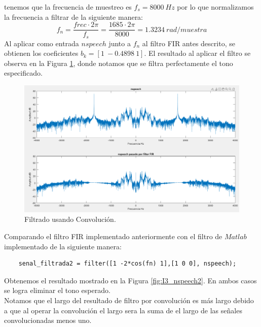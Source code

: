 \documentclass[letterpaper,onecolumn,10pt,journal,final]{IEEEtran}
\begin{document}
\begin{enumerate}[1)]
    tenemos que la frecuencia de muestreo es $f_s = 8000~Hz$ por lo que normalizamos la frecuencia a filtrar de la siguiente manera:
    \begin{equation*}
        f_n = \frac{frec \cdot 2 \pi}{f_s} = \frac{1685 \cdot 2 \pi }{ 8000 } = 1.3234 ~ rad/muestra
    \end{equation*}
    Al aplicar como entrada $nspeech$ junto a $f_n$ al filtro FIR antes descrito, se obtienen los coeficientes $b_k = [1~-0.4898~1]$. El resultado al aplicar el filtro se observa en la Figura \ref{fig:I3_nspeech}, donde notamos que se filtra perfectamente el tono especificado.
    \begin{figure}[H]
        \centering
        \includegraphics[width=0.75 \linewidth]{Figuras/I_3)_conv.png}
        \caption{Filtrado usando Convolución.}
        \label{fig:I3_nspeech}
    \end{figure}
    Comparando el filtro FIR implementado anteriormente con el filtro de $Matlab$ implementado de la siguiente manera:
    \begin{lstlisting}
    senal_filtrada2 = filter([1 -2*cos(fn) 1],[1 0 0], nspeech);
    \end{lstlisting}
    Obtenemos el resultado mostrado en la Figura \ref{fig:I3_nspeech2}. En ambos casos se logra eliminar el tono esperado.\\ Notamos que el largo del resultado de filtro por convolución es más largo debido a que al operar la convolución el largo sera la suma de el largo de las señales convolucionadas menos uno. 
    

\end{enumerate}
\end{document}
